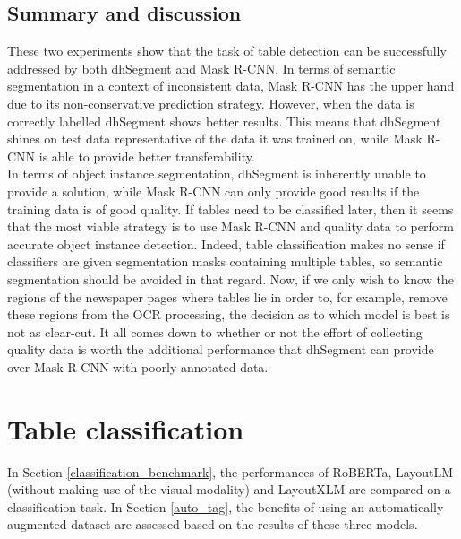\subsection{Summary and discussion}
These two experiments show that the task of table detection can be successfully addressed by both dhSegment and Mask R-CNN. In terms of semantic segmentation in a context of inconsistent data, Mask R-CNN has the upper hand due to its non-conservative prediction strategy. However, when the data is correctly labelled dhSegment shows better results. This means that dhSegment shines on test data representative of the data it was trained on, while Mask R-CNN is able to provide better transferability. \\
In terms of object instance segmentation, dhSegment is inherently unable to provide a solution, while Mask R-CNN can only provide good results if the training data is of good quality. If tables need to be classified later, then it seems that the most viable strategy is to use Mask R-CNN and quality data to perform accurate object instance detection. Indeed, table classification makes no sense if classifiers are given segmentation masks containing multiple tables, so semantic segmentation should be avoided in that regard. Now, if we only wish to know the regions of the newspaper pages where tables lie in order to, for example, remove these regions from the OCR processing, the decision as to which model is best is not as clear-cut. It all comes down to whether or not the effort of collecting quality data is worth the additional performance that dhSegment can provide over Mask R-CNN with poorly annotated data.

\section{Table classification}
\label{experiments_table_classification}
In Section \ref{classification_benchmark}, the performances of RoBERTa, LayoutLM (without making use of the visual modality) and LayoutXLM are compared on a classification task. In Section \ref{auto_tag}, the benefits of using an automatically augmented dataset are assessed based on the results of these three models.

